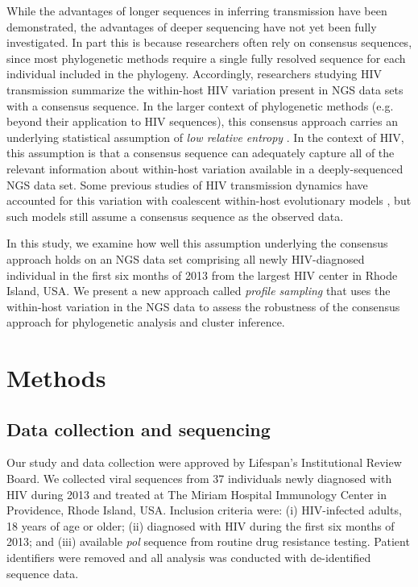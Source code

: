 \documentclass[letterpaper]{article}
\begin{document}
While the advantages of longer sequences in inferring transmission have been demonstrated, the advantages of deeper sequencing have not yet been fully investigated. In part this is because researchers often rely on consensus sequences, since most phylogenetic methods require a single fully resolved sequence for each individual included in the phylogeny. Accordingly, researchers studying HIV transmission summarize the within-host HIV variation present in NGS data sets with a consensus sequence. In the larger context of phylogenetic methods (e.g. beyond their application to HIV sequences), this consensus approach carries an underlying statistical assumption of \emph{low relative entropy} \parencite{guang}. In the context of HIV, this assumption is that a consensus sequence can adequately capture all of the relevant information about within-host variation available in a deeply-sequenced NGS data set. Some previous studies of HIV transmission dynamics have accounted for this variation with coalescent within-host evolutionary models \parencite{giardina, romero-severson}, but such models still assume a consensus sequence as the observed data.

In this study, we examine how well this assumption underlying the consensus approach holds on an NGS data set comprising all newly HIV-diagnosed individual in the first six months of 2013 from the largest HIV center in Rhode Island, USA. We present a new approach called \emph{profile sampling} that uses the within-host variation in the NGS data to assess the robustness of the consensus approach for phylogenetic analysis and cluster inference.

\section*{Methods}

\subsection*{Data collection and sequencing}

Our study and data collection were approved by Lifespan's Institutional Review Board. We collected viral sequences from 37 individuals newly diagnosed with HIV during 2013 and treated at The Miriam Hospital Immunology Center in Providence, Rhode Island, USA. Inclusion criteria were: (i) HIV-infected adults, 18 years of age or older; (ii) diagnosed with HIV during the first six months of 2013; and (iii) available \emph{pol} sequence from routine drug resistance testing. Patient identifiers were removed and all analysis was conducted with de-identified sequence data.
\end{document}
